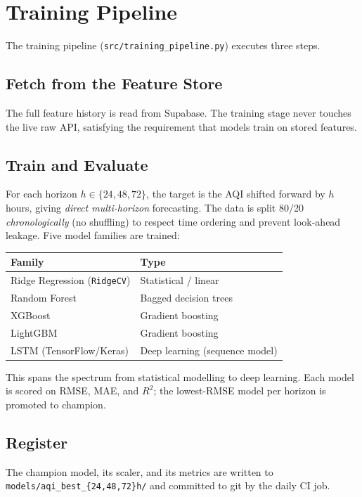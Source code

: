 \documentclass[11pt,a4paper]{article}
\newcommand{\rsq}{$R^2$}
\begin{document}
\section{Training Pipeline}
The training pipeline (\texttt{src/training\_pipeline.py}) executes three steps.

\subsection{Fetch from the Feature Store}
The full feature history is read from Supabase. The training stage never touches
the live raw API, satisfying the requirement that models train on stored
features.

\subsection{Train and Evaluate}
For each horizon $h \in \{24, 48, 72\}$, the target is the AQI shifted forward
by $h$ hours, giving \emph{direct multi-horizon} forecasting. The data is split
80/20 \emph{chronologically} (no shuffling) to respect time ordering and prevent
look-ahead leakage. Five model families are trained:

\begin{center}
\begin{tabular}{@{}ll@{}}
\toprule
\textbf{Family} & \textbf{Type} \\
\midrule
Ridge Regression (\texttt{RidgeCV}) & Statistical / linear \\
Random Forest & Bagged decision trees \\
XGBoost & Gradient boosting \\
LightGBM & Gradient boosting \\
LSTM (TensorFlow/Keras) & Deep learning (sequence model) \\
\bottomrule
\end{tabular}
\end{center}

This spans the spectrum from statistical modelling to deep learning. Each model
is scored on RMSE, MAE, and \rsq{}; the lowest-RMSE model per horizon is
promoted to champion.

\subsection{Register}
The champion model, its scaler, and its metrics are written to
\texttt{models/aqi\_best\_\{24,48,72\}h/} and committed to git by the daily CI
job.
\end{document}
